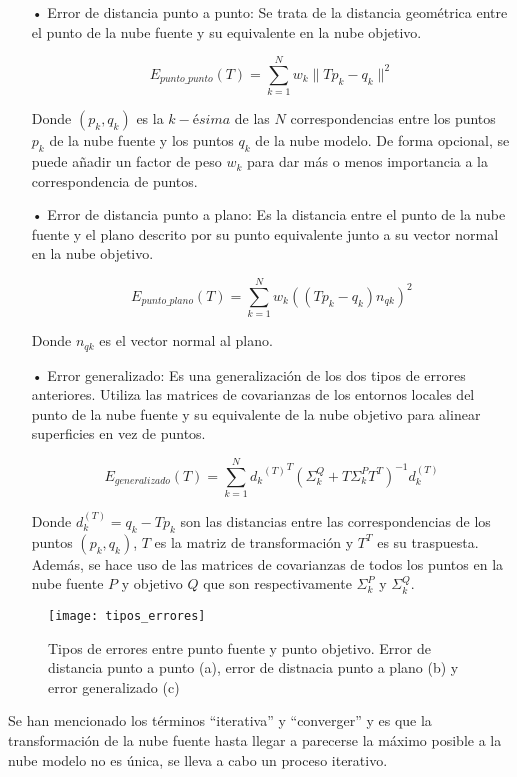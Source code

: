 \begin{itemize}
\item[•]Error de distancia punto a punto:
Se trata de la distancia geométrica entre el punto de la nube fuente y su equivalente en la nube objetivo.

$$E_{punto\_punto}(T)=\sum_{k=1}^{N} w_{k}\| Tp_{k}-q_{k} \|^2$$

Donde $(p_{k},q_{k})$ es la $k-ésima$ de las $N$ correspondencias entre los puntos $p_k$ de la nube fuente y los puntos $q_k$ de la nube modelo. De forma opcional, se puede añadir un factor de peso $w_k$ para dar más o menos importancia a la correspondencia de puntos.

\item[•]Error de distancia punto a plano:
Es la distancia entre el punto de la nube fuente y el plano descrito por su punto equivalente junto a su vector normal en la nube objetivo.

$$E_{punto\_plano}(T)=\sum_{k=1}^{N} w_{k} ((Tp_{k}-q_{k})n_{qk}) ^2$$

Donde $n_{qk}$ es el vector normal al plano.

\item[•]Error generalizado:
Es una generalización de los dos tipos de errores anteriores. Utiliza las matrices de covarianzas de los entornos locales del punto de la nube fuente y su equivalente de la nube objetivo para alinear superficies en vez de puntos.

$$E_{generalizado}(T)=\sum_{k=1}^{N} {{d_{k}}^{(T)}}^{T} (\Sigma_{k}^{Q}+T\Sigma_{k}^{P}T^{T})^{-1}d_{k}^{(T)}$$

Donde $d_{k}^{(T)}=q_{k}-Tp_{k}$ son las distancias entre las correspondencias de los puntos $(p_{k},q_{k})$, $T$ es la matriz de transformación y $T^T$ es su traspuesta. Además, se hace uso de las matrices de covarianzas de todos los puntos en la nube fuente $P$ y objetivo $Q$ que son respectivamente $\Sigma_{k}^{P}$ y $\Sigma_{k}^{Q}$.
\end{itemize}

\begin{figure}
\centering
\texttt{[image: tipos\_errores]}
\caption{Tipos de errores entre punto fuente y punto objetivo. Error de distancia punto a punto (a), error de distnacia punto a plano (b) y error generalizado (c)}\label{fig:tipos_errores}
\end{figure}


Se han mencionado los términos ``iterativa'' y ``converger'' y es que la transformación de la nube fuente hasta llegar a parecerse la máximo posible a la nube modelo no es única, se lleva a cabo un proceso iterativo. 

